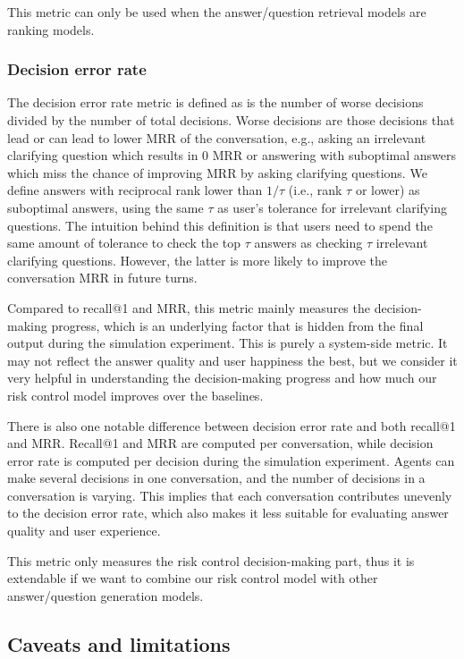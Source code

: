 \documentclass[format=acmsmall, review=False, screen=true]{acmart}
\begin{document}
This metric can only be used when the answer/question retrieval models are ranking models.

\subsubsection{\textbf{Decision error rate}}

The decision error rate metric is defined as is the number of worse decisions divided by the number of total decisions. Worse decisions are those decisions that lead or can lead to lower MRR of the conversation, e.g., asking an irrelevant clarifying question which results in 0 MRR or answering with suboptimal answers which miss the chance of improving MRR by asking clarifying questions. We define answers with reciprocal rank lower than $1/\tau$ (i.e., rank $\tau$ or lower) as suboptimal answers, using the same $\tau$ as user's tolerance for irrelevant clarifying questions. The intuition behind this definition is that users need to spend the same amount of tolerance to check the top $\tau$ answers as checking $\tau$ irrelevant clarifying questions. However, the latter is more likely to improve the conversation MRR in future turns.

Compared to recall@1 and MRR, this metric mainly measures the decision-making progress, which is an underlying factor that is hidden from the final output during the simulation experiment. This is purely a system-side metric. It may not reflect the answer quality and user happiness the best, but we consider it very helpful in understanding the decision-making progress and how much our risk control model improves over the baselines. 

There is also one notable difference between decision error rate and both recall@1 and MRR. Recall@1 and MRR are computed per conversation, while decision error rate is computed per decision during the simulation experiment. Agents can make several decisions in one conversation, and the number of decisions in a conversation is varying. This implies that each conversation contributes unevenly to the decision error rate, which also makes it less suitable for evaluating answer quality and user experience. 

This metric only measures the risk control decision-making part, thus it is extendable if we want to combine our risk control model with other answer/question generation models.

\subsection{Caveats and limitations}
\end{document}
